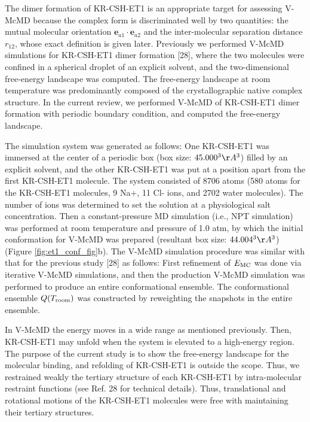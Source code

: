The dimer formation of KR-CSH-ET1 is an appropriate target for assessing V-McMD because the complex form is discriminated well by two quantities: the mutual molecular orientation $\bm{e}_{a1} \cdot \bm{e}_{a2}$ and the inter-molecular separation distance $r_{12}$, whose exact definition is given later. Previously we performed V-McMD simulations for KR-CSH-ET1 dimer formation [28], where the two molecules were confined in a spherical droplet of an explicit solvent, and the two-dimensional free-energy landscape was computed. The free-energy landscape at room temperature was predominantly composed of the crystallographic native complex structure. In the current review, we performed V-McMD of KR-CSH-ET1 dimer formation with periodic boundary condition, and computed the free-energy landscape. 

The simulation system was generated as follows: One KR-CSH-ET1 was immersed at the center of a periodic box (box size:  $45.000^3 \AA^3$) filled by an explicit solvent, and the other KR-CSH-ET1 was put at a position apart from the first KR-CSH-ET1 molecule. The system consisted of 8706 atoms (580 atoms for the KR-CSH-ET1 molecules, 9 Na+, 11 Cl- ions, and 2702 water molecules). The number of ions was determined to set the solution at a physiological salt concentration. Then a constant-pressure MD simulation (i.e., NPT simulation) was performed at room temperature and pressure of 1.0 atm, by which the initial conformation for V-McMD was prepared (resultant box size: $44.004^3 \AA^3$) (Figure \ref{fig:et1_conf_fig}b). The V-McMD simulation procedure was similar with that for the previous study [28] as follows: First refinement of $E_{\rm MC}$ was done via iterative V-McMD simulations, and then the production V-McMD simulation was performed to produce an entire conformational ensemble. The conformational ensemble $Q(T_{\rm room})$ was constructed by reweighting the snapshots in the entire ensemble. 

In V-McMD the energy moves in a wide range as mentioned previously. Then, KR-CSH-ET1 may unfold when the system is elevated to a high-energy region. The purpose of the current study is to show the free-energy landscape for the molecular binding, and refolding of KR-CSH-ET1 is outside the scope. Thus, we restrained weakly the tertiary structure of each KR-CSH-ET1 by intra-molecular restraint functions (see Ref. 28 for technical details). Thus, translational and rotational motions of the KR-CSH-ET1 molecules were free with maintaining their tertiary structures.

